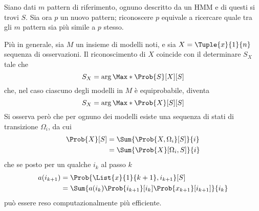 \documentclass{subfiles}
\begin{document}
Siano dati \(m\) pattern di riferimento, ognuno descritto da un HMM e di questi si trovi \(S\).
Sia ora \(p\) un nuovo pattern; riconoscere \(p\) equivale a ricercare quale tra gli \(m\) pattern sia più simile a \(p\) stesso.

Più in generale, sia \(M\) un insieme di modelli noti, e sia \(X = \Tuple{x}{1}{n}\) sequenza di osservazioni.
Il riconoscimento di \(X\) coincide con il determinare \(S_{X}\) tale che
\[
    S_{X} = \arg \Max*{\Prob{S}[X]}[S]
\]
che, nel caso ciascuno degli modelli in \(M\) è equiprobabile, diventa
\[
    S_{X} = \arg \Max*{\Prob{X}[S]}[S]
\]
Si osserva però che per ognuno dei modelli esiste una sequenza di stati di transizione \(\Omega_{i}\), da cui
\[\begin{aligned}
        \Prob{X}[S] & = \Sum{\Prob{X, \Omega_{i}}[S]}{i} \\
                    & = \Sum{\Prob{X}[\Omega_{i}, S]}{i}
    \end{aligned}\]
che se posto per un qualche \(i_{k}\) al passo \(k\)
\[\begin{aligned}
        a(i_{k + 1}) & = \Prob{\List{x}{1}{k + 1}, i_{k + 1}}[S]                                   \\
                     & = \Sum{a({i_k}) \Prob{i_{k + 1}}[i_{k}] \Prob{x_{k + 1}}[i_{k + 1}]}{i_{k}}
    \end{aligned}\]
può essere reso computazionalmente più efficiente.
\end{document}
